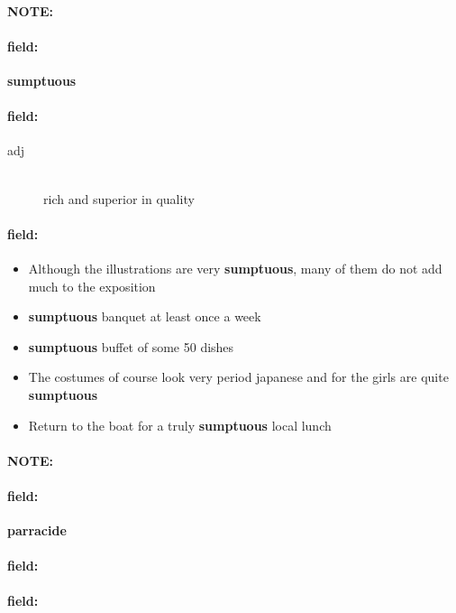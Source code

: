 \documentclass[12pt]{article}
\newenvironment{note}{\paragraph{NOTE:}}{}
\newenvironment{field}{\paragraph{field:}}{}
\begin{document}
\begin{note}
\begin{field}
\textbf{\large sumptuous}
\end{field}


\begin{field}
\begin{description}
\item[adj] \hfill \\ 
rich and superior in quality

\end{description}
\end{field}

\begin{field}
\begin{itemize}
\item Although the illustrations are very \textbf{sumptuous}, many of them do not add much to the exposition
\item \textbf{sumptuous} banquet at least once a week
\item \textbf{sumptuous} buffet of some 50 dishes
\item The costumes of course look very period japanese and for the girls are quite \textbf{sumptuous}
\item Return to the boat for a truly \textbf{sumptuous} local lunch
\end{itemize}
\end{field}
\end{note}
\begin{note}
\begin{field}
\textbf{\large parracide}
\end{field}


\begin{field}
\end{field}

\begin{field}
\end{field}
\end{note}
\end{document}
